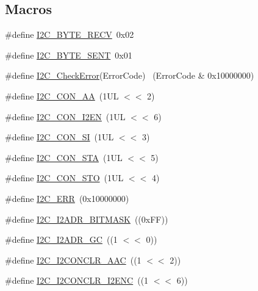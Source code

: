 \subsection*{Macros}
\begin{DoxyCompactItemize}
\item 
\#define \hyperlink{group__I2C__17XX__40XX_ga90031db9f3a3abcdb6c278046019048d}{I2\+C\+\_\+\+B\+Y\+T\+E\+\_\+\+R\+E\+CV}~0x02
\item 
\#define \hyperlink{group__I2C__17XX__40XX_ga7b419c9f5e25bec1367f655cb2552e2e}{I2\+C\+\_\+\+B\+Y\+T\+E\+\_\+\+S\+E\+NT}~0x01
\item 
\#define \hyperlink{group__I2C__17XX__40XX_gac0db244c4c7701bf94e2f5646b69dc2a}{I2\+C\+\_\+\+Check\+Error}(Error\+Code)  ~(Error\+Code \& 0x10000000)
\item 
\#define \hyperlink{group__I2C__17XX__40XX_gafd39e9ced8b71fd55deb05d7a23752b9}{I2\+C\+\_\+\+C\+O\+N\+\_\+\+AA}~(1\+U\+L $<$$<$ 2)
\item 
\#define \hyperlink{group__I2C__17XX__40XX_ga5a696207d04d3694700e427a068409b1}{I2\+C\+\_\+\+C\+O\+N\+\_\+\+I2\+EN}~(1\+U\+L $<$$<$ 6)
\item 
\#define \hyperlink{group__I2C__17XX__40XX_gad53ba19314d57093aaa5076897604a50}{I2\+C\+\_\+\+C\+O\+N\+\_\+\+SI}~(1\+U\+L $<$$<$ 3)
\item 
\#define \hyperlink{group__I2C__17XX__40XX_ga75e0835be79d812d1e6df8b0a5150365}{I2\+C\+\_\+\+C\+O\+N\+\_\+\+S\+TA}~(1\+U\+L $<$$<$ 5)
\item 
\#define \hyperlink{group__I2C__17XX__40XX_ga9704c03008de747eb42bde530a67350b}{I2\+C\+\_\+\+C\+O\+N\+\_\+\+S\+TO}~(1\+U\+L $<$$<$ 4)
\item 
\#define \hyperlink{group__I2C__17XX__40XX_ga2e11959cc0c956258dc4833ccdee1504}{I2\+C\+\_\+\+E\+RR}~(0x10000000)
\item 
\#define \hyperlink{group__I2C__17XX__40XX_ga8d5195514172b58efd29f09642566d37}{I2\+C\+\_\+\+I2\+A\+D\+R\+\_\+\+B\+I\+T\+M\+A\+SK}~((0x\+F\+F))
\item 
\#define \hyperlink{group__I2C__17XX__40XX_ga2509515124601141b72080b5daf45009}{I2\+C\+\_\+\+I2\+A\+D\+R\+\_\+\+GC}~((1 $<$$<$ 0))
\item 
\#define \hyperlink{group__I2C__17XX__40XX_gaa13b19babb8442aa9047f8ecb92a908d}{I2\+C\+\_\+\+I2\+C\+O\+N\+C\+L\+R\+\_\+\+A\+AC}~((1 $<$$<$ 2))
\item 
\#define \hyperlink{group__I2C__17XX__40XX_ga92718ac11d46f6e32d526749f09d01b2}{I2\+C\+\_\+\+I2\+C\+O\+N\+C\+L\+R\+\_\+\+I2\+E\+NC}~((1 $<$$<$ 6))
\item 

\end{DoxyCompactItemize}
